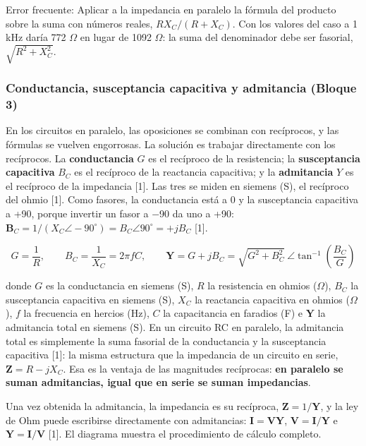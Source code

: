 \documentclass[11pt,letterpaper]{article}
\begin{document}
\begin{nota}{Error frecuente:}
Aplicar a la impedancia en paralelo la fórmula del producto sobre la suma con números reales, $R X_C / (R + X_C)$. Con los valores del caso a 1 kHz daría 772 \ensuremath{\Omega} en lugar de 1092 \ensuremath{\Omega}: la suma del denominador debe ser fasorial, $\sqrt{R^2 + X_C^2}$.
\end{nota}

\subsubsection{Conductancia, susceptancia capacitiva y admitancia (Bloque 3)}

En los circuitos en paralelo, las oposiciones se combinan con recíprocos, y las fórmulas se vuelven engorrosas. La solución es trabajar directamente con los recíprocos. La \textbf{conductancia} $G$ es el recíproco de la resistencia; la \textbf{susceptancia capacitiva} $B_C$ es el recíproco de la reactancia capacitiva; y la \textbf{admitancia} $Y$ es el recíproco de la impedancia [1]. Las tres se miden en siemens (S), el recíproco del ohmio [1]. Como fasores, la conductancia está a 0\textdegree{} y la susceptancia capacitiva a +90\textdegree{}, porque invertir un fasor a \ensuremath{-}90\textdegree{} da uno a +90\textdegree{}: $\mathbf{B}_C = 1/(X_C \angle -90^\circ) = B_C \angle 90^\circ = +jB_C$ [1].

\begin{equation}
  G = \frac{1}{R}, \qquad B_C = \frac{1}{X_C} = 2\pi f C, \qquad \mathbf{Y} = G + jB_C = \sqrt{G^{2} + B_C^{2}}\ \angle \tan^{-1}\!\left(\frac{B_C}{G}\right)
\end{equation}

donde $G$ es la conductancia en siemens (S), $R$ la resistencia en ohmios (\ensuremath{\Omega}), $B_C$ la susceptancia capacitiva en siemens (S), $X_C$ la reactancia capacitiva en ohmios (\ensuremath{\Omega}), $f$ la frecuencia en hercios (Hz), $C$ la capacitancia en faradios (F) e $\mathbf{Y}$ la admitancia total en siemens (S). En un circuito RC en paralelo, la admitancia total es simplemente la suma fasorial de la conductancia y la susceptancia capacitiva [1]: la misma estructura que la impedancia de un circuito en serie, $\mathbf{Z} = R - jX_C$. Esa es la ventaja de las magnitudes recíprocas: \textbf{en paralelo se suman admitancias, igual que en serie se suman impedancias}.

Una vez obtenida la admitancia, la impedancia es su recíproca, $\mathbf{Z} = 1/\mathbf{Y}$, y la ley de Ohm puede escribirse directamente con admitancias: $\mathbf{I} = \mathbf{V}\mathbf{Y}$, $\mathbf{V} = \mathbf{I}/\mathbf{Y}$ e $\mathbf{Y} = \mathbf{I}/\mathbf{V}$ [1]. El diagrama muestra el procedimiento de cálculo completo.
\end{document}
